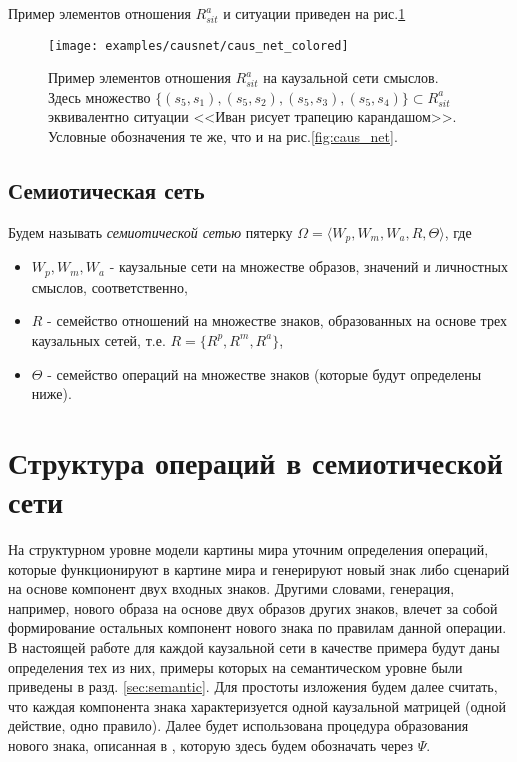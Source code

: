 \documentclass[12pt]{scrartcl}
\begin{document}
	Пример элементов отношения $R_{sit}^a$ и ситуации приведен на рис.\ref{fig:mean_relat}

	\begin{figure}
		\centering
		\texttt{[image: examples/causnet/caus\_net\_colored]}
		\caption{Пример элементов отношения $R_{sit}^a$ на каузальной сети смыслов. Здесь множество $\{(s_5,s_1),(s_5,s_2),(s_5,s_3),(s_5,s_4)\}\subset R_{sit}^a$ эквивалентно ситуации <<Иван рисует трапецию карандашом>>. Условные обозначения те же, что и на рис.\ref{fig:caus_net}.}
		\label{fig:mean_relat}		
	\end{figure}
			
	\subsection{Семиотическая сеть}
	Будем называть \textit{семиотической сетью} пятерку $\Omega=\langle W_p, W_m, W_a, R, \Theta \rangle$, где
	\begin{itemize}
		\item $W_p, W_m, W_a$ - каузальные сети на множестве образов, значений и личностных смыслов, соответственно,
		\item $R$ - семейство отношений на множестве знаков, образованных на основе трех каузальных сетей, т.е. $R=\{R^p, R^m, R^a\}$,
		\item $\Theta$ - семейство операций на множестве знаков (которые будут определены ниже).
	\end{itemize} 
	

	\section{Структура операций в семиотической сети}\label{sec:operations}
	На структурном уровне модели картины мира уточним определения операций, которые функционируют в картине мира и генерируют новый знак либо сценарий на основе компонент двух входных знаков. Другими словами, генерация, например, нового образа на основе двух образов других знаков, влечет за собой формирование остальных компонент нового знака по  правилам данной операции. В настоящей работе для каждой каузальной сети в качестве примера будут даны определения тех из них, примеры которых на семантическом уровне были приведены в разд. \ref{sec:semantic}. Для простоты изложения будем далее считать, что каждая компонента знака характеризуется одной каузальной матрицей (одной действие, одно правило). Далее будет использована процедура образования нового знака, описанная в \cite{Osipov2014c}, которую здесь будем обозначать через $\Psi$.
	
\end{document}
